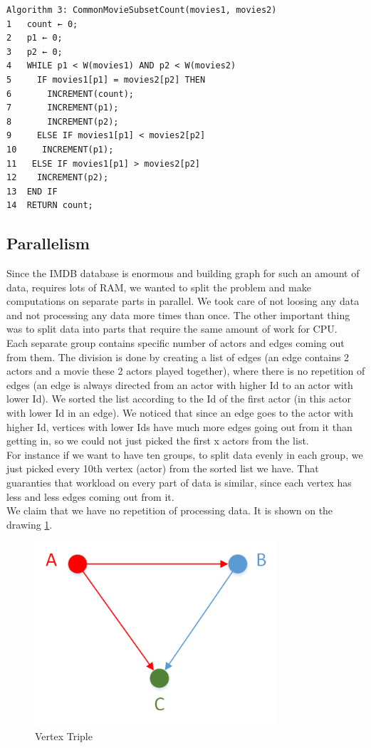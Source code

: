 \begin{verbatim}
Algorithm 3: CommonMovieSubsetCount(movies1, movies2)
1	count ← 0;
2	p1 ← 0;
3	p2 ← 0;
4	WHILE p1 < W(movies1) AND p2 < W(movies2)
5	  IF movies1[p1] = movies2[p2] THEN
6	    INCREMENT(count);
7	    INCREMENT(p1);
8	    INCREMENT(p2);
9	  ELSE IF movies1[p1] < movies2[p2]
10	   INCREMENT(p1);
11	 ELSE IF movies1[p1] > movies2[p2]
12	  INCREMENT(p2);
13	END IF
14	RETURN count;
\end{verbatim}

\subsection{Parallelism}
Since the IMDB database is enormous and building graph for such an amount of data, requires lots of RAM, we wanted to split the problem and make computations on separate parts in parallel. We took care of not loosing any data and not processing any data more times than once. The other important thing was to split data into parts that require the same amount of work for CPU.
\\
Each separate group contains specific number of actors and edges coming out from them. The division is done by creating a list of edges (an edge contains 2 actors and a movie these 2 actors played together), where there is no repetition of edges (an edge is always directed from an actor with higher Id to an actor with lower Id). We sorted the list according to the Id of the first actor (in this actor with lower Id in an edge). We noticed that since an edge goes to the actor with higher Id, vertices with lower Ids have much more edges going out from it than getting in, so we could not just picked the first x actors from the list. 
\\
For instance if we want to have ten groups, to split data evenly in each group, we just picked every 10th vertex (actor) from the sorted list we have. That guaranties that workload on every part of data is similar, since each vertex has less and less edges coming out from it.
\\
We claim that we have no repetition of processing data. It is shown on the drawing \ref{triple}.

\begin{figure}[ht!]
\centering
\includegraphics[width=90mm]{resources/triple.png}
\caption{Vertex Triple}
\label{triple}
\end{figure}


